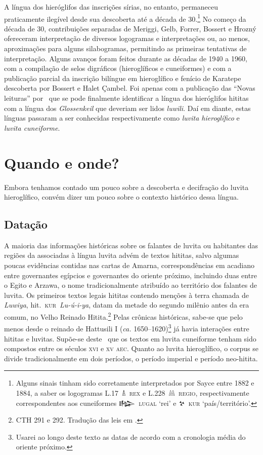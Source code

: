 A língua dos hieróglifos das inscrições sírias, no entanto, permaneceu
praticamente ilegível desde sua descoberta até a década de 30.\footnote{Alguns
	sinais tinham sido corretamente interpretados por Sayce entre 1882 e 1884, a
	saber os logogramas \mbox{L.17 𔐑 \textsc{rex}} e \mbox{L.228 𔔆 \textsc{regio}},
	respectivamente correspondentes aos cuneiformes
	\mbox{\foreignlanguage{hittite}{𒈗} \textsc{lugal}} `rei' e \mbox{\foreignlanguage{hittite}{𒆳} \textsc{kur}}
	`país\slash{}território'.}
No começo da década de 30, contribuições separadas de Meriggi, Gelb, Forrer,
Bossert e Hrozný ofereceram interpretação de diversos logogramas e
interpretações ou, ao menos, aproximações para alguns silabogramas,
permitindo as primeiras tentativas de interpretação.
Alguns avanços foram feitos durante as décadas de 1940 a 1960, com a compilação
de selos digráficos (hieroglíficos e cuneiformes) e com a publicação parcial da
inscrição bilíngue em hieroglífico e fenício de Karatepe descoberta por
Bossert e Halet Çambel.
Foi apenas com a publicação das ``Novas leituras''
por~\textcite{HawkinsMorpurgoNeumann1974} que se pode finalmente identificar a
língua dos hieróglifos hititas com a língua dos
\emph{\foreignlanguage{german}{Glossenkeil}} que deveriam
ser lidos \emph{luwili}.
Daí em diante, estas línguas passaram a ser conhecidas respectivamente como
\emph{luvita hieroglífico} e \emph{luvita cuneiforme}.

\section{Quando e onde?}

Embora tenhamos contado um pouco sobre a descoberta e decifração do luvita
hieroglífico, convém dizer um pouco sobre o contexto histórico dessa língua.

\subsection{Datação}
A maioria das informações históricas sobre os falantes de luvita ou habitantes
das regiões da associadas à língua luvita advém de textos hititas, salvo algumas
poucas evidências contidas nas cartas de Amarna, correspondências em acadiano
entre governantes egípcios e governantes do oriente próximo, incluindo duas
entre o Egito e Arzawa, o nome tradicionalmente atribuído ao território dos
falantes de luvita.
Os primeiros textos legais hititas contendo menções à
terra chamada de \emph{Luwiya}, hit.\ \mbox{\textsc{kur} \textit{Lu-ú-i-ya}},
datam da metade do segundo milênio antes da era comum, no Velho Reinado
Hitita.\footnote{CTH 291 e 292. Tradução das leis em \textcite{Hoffner1997}.}
Pelas crônicas históricas, sabe-se que pelo menos desde o reinado de Hattusili I
(\emph{ca.} 1650--1620)\footnote{Usarei ao longo deste texto as datas de acordo
	com a cronologia média do oriente próximo.} já havia interações entre hititas
e luvitas.
Supõe-se deste~\textcite{Starke1985} que os textos em luvita cuneiforme tenham
sido compostos entre os séculos \textsc{xvi} e \textsc{xv} \textsc{aec}.
Quanto ao luvita hieroglífico, o corpus se divide tradicionalmente em dois
períodos, o período imperial e período neo-hitita.

